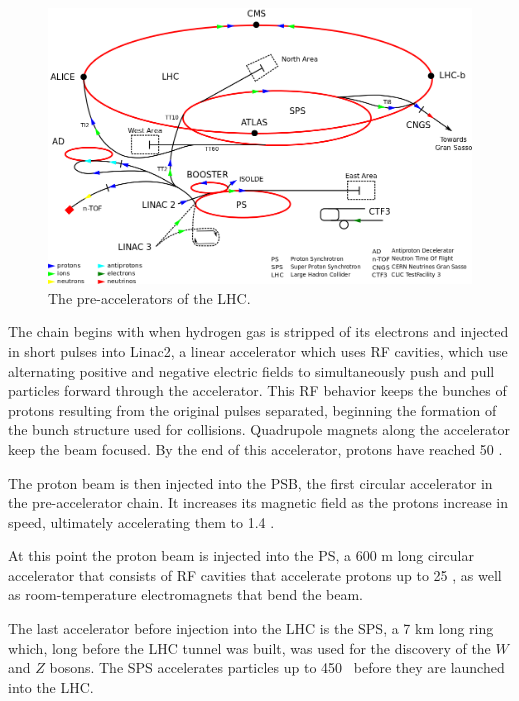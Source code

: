 \begin{centering}
\begin{figure}[!hbt]
\myfloatalign
\includegraphics[width=.90\linewidth]{figures/lhc/Cern-accelerator-complex.png}
\caption{The pre-accelerators of the \ac{LHC}.}
\label{fig:preacc}
\end{figure}
\end{centering}

The chain begins with when hydrogen gas is stripped of its electrons and injected in short pulses into Linac2, a linear accelerator which uses \ac{RF} cavities, which use alternating positive and negative electric fields to simultaneously push and pull particles forward through the accelerator. This \ac{RF} behavior keeps the bunches of protons resulting from the original pulses separated, beginning the formation of the bunch structure used for collisions. Quadrupole magnets along the accelerator keep the beam focused. By the end of this accelerator, protons have reached 50 \mev. 

The proton beam is then injected into the \ac{PSB}, the first circular accelerator in the pre-accelerator chain. It increases its magnetic field as the protons increase in speed, ultimately accelerating them to 1.4 \gev. 

At this point the proton beam is injected into the \ac{PS}, a 600 m long circular accelerator that consists of \ac{RF} cavities that accelerate protons up to 25 \gev, as well as room-temperature electromagnets that bend the beam. 

The last accelerator before injection into the \ac{LHC} is the \ac{SPS}, a 7 km long ring which, long before the \ac{LHC} tunnel was built, was used for the discovery of the $W$ and $Z$ bosons. The \ac{SPS} accelerates particles up to 450 \gev~before they are launched into the \ac{LHC}. 

